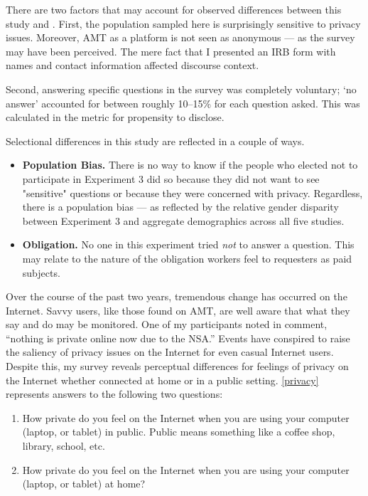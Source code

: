 There are two factors that may account for observed differences between this study and  \citet{Acquisti:2012tp}.  First, the population sampled here is surprisingly sensitive to privacy issues. Moreover, AMT as a platform is not seen as anonymous --- as the  \citet{Acquisti:2012tp}  survey may have been perceived. The mere fact that I presented an IRB form with names and contact information affected discourse context.

Second, answering specific questions in the  \cite{Acquisti:2012tp}  survey was completely voluntary; `no answer' accounted for between roughly 10--15\% for each question asked. This was calculated in the metric for propensity to disclose.

Selectional differences in this study are reflected in a couple of ways.

\begin{itemize}
 \item \textbf{Population Bias.} There is no way to know if the people who elected not to participate in Experiment 3 did so because they did not want to see "sensitive" questions or because they were concerned with privacy. Regardless, there is a population bias --- as reflected by the relative gender disparity between Experiment 3 and aggregate demographics across all five studies.
\item \textbf{Obligation.} No one in this experiment tried \textit{not} to answer a question. This may relate to the nature of the obligation workers feel to requesters as paid subjects. 
\end{itemize}


Over the course of the past two years, tremendous change has occurred on the Internet. Savvy users, like those found on AMT, are well aware that what they say and do may be monitored. One of my participants noted in comment, ``nothing is private online now due to the NSA.'' Events have conspired to raise the saliency of privacy issues on the Internet for even casual Internet users. Despite this, my survey reveals perceptual differences for feelings of privacy on the Internet whether connected at home or in a public setting. \autoref{privacy}  represents answers to the following two questions:

\begin{enumerate}
\item How private do you feel on the Internet when you are using your computer (laptop, or tablet) in public. Public means something like a coffee shop, library, school, etc.
\item How private do you feel on the Internet when you are using your computer (laptop, or tablet) at home?
\end{enumerate}

